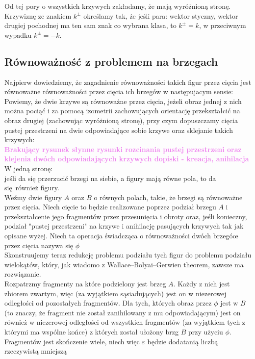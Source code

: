 \documentclass[a4paper, 12pt]{article}
\newcommand{\rysunek}[1]{\hfill \break\\[16pt] \Huge \textbf{\textcolor{violet}{Brakujący rysunek \normalsize
#1}} \hfill
\break \\[16pt] \normalsize}
\begin{document}
Od tej pory o wszystkich krzywych zakładamy, że mają wyróżnioną stronę.
Krzywiznę ze znakiem $k^\pm$ określamy tak, że jeśli para: wektor styczny, wektor drugiej pochodnej ma ten
sam znak co wybrana klasa, to $k^\pm = k$, w przeciwnym wypadku $k^\pm = -k$.
\subsection{Równoważność z problemem na brzegach}
Najpierw dowiedziemy, że zagadnienie równoważności takich figur przez cięcia jest równoważne równoważności
przez cięcia ich brzegów w następujacym sensie: \\
Powiemy, że dwie krzywe są równoważne przez cięcia, jeżeli obraz jednej z nich można pociąć i za pomocą
izometrii zachowujących orientację przekształcić na obraz drugiej (zachowując wyróżnioną stronę), przy czym dopuszczamy cięcia pustej
przestrzeni na dwie
odpowiadające sobie krzywe oraz sklejanie takich krzywych:
\rysunek{słynne rysunki rozcinania pustej przestrzeni oraz klejenia dwóch odpowiadających krzywych
dopiski - kreacja, anihilacja}
W jedną stronę: \\
jeśli da się przerzucić brzegi na siebie, a figury mają równe pola, to da się również figury. \\
Weźmy dwie figury $A$ oraz $B$ o równych polach, takie, że brzegi są równoważne przez cięcia. Niech cięcie
to będzie realizowane poprzez podział brzegu $A$ i przekształcenie jego fragmentów przez przesunięcia
i obroty oraz,
jeśli konieczny, podział "pustej przestrzeni" na krzywe i anihilację pasujących krzywych tak jak opisane
wyżej. Niech ta operacja świadcząca o równoważności dwóch brzegóœ przez cięcia nazywa się $\phi$ \\
Skonstruujemy teraz redukcję problemu podziału tych figur do problemu podziału wielokątów, który, jak wiadomo
 z Wallace–Bolyai–Gerwien theorem, zawsze ma rozwiązanie. \\
Rozpatrzmy fragmenty na które podzielony jest brzeg $A$. Każdy z nich jest zbiorem zwartym, więc
(za wyjątkiem sąsiadujących) jest on w niezerowej odległości od pozostałych fragmentów. Dla tych, których
 obraz przez $\phi$ jest w $B$ (to znaczy, że fragment nie został zanihilowany z mu odpowiadającym)
 jest on również w niezerowej odległości od wszystkich fragmentów (za wyjątkiem tych z którymi ma wspólne
 końce) z których został ułożony brzg $B$ przy  użyciu $\phi$.  \\
Fragmentów jest skończenie wiele, niech więc $\varepsilon$ będzie dodatanią liczbą rzeczywistą mniejszą
\end{document}
